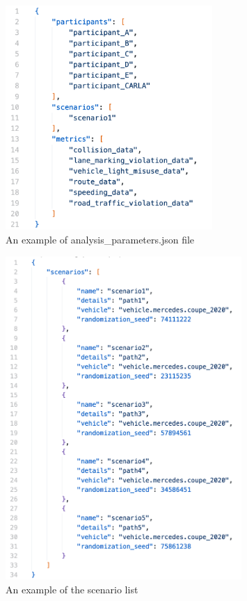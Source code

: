 \begin{figure}
    \centering
    \includegraphics[width = 0.7\textwidth]{research_paper/Images/analysis_parameters.png}
    \caption{An example of analysis\_parameters.json file}
    \label{fig:analysis_parameters}
\end{figure}

\begin{figure}
    \centering
    \includegraphics[width = 0.8\textwidth]{research_paper/Images/scenario_list.png}
    \caption{An example of the scenario list}
    \label{fig:scenario_list}
\end{figure}


